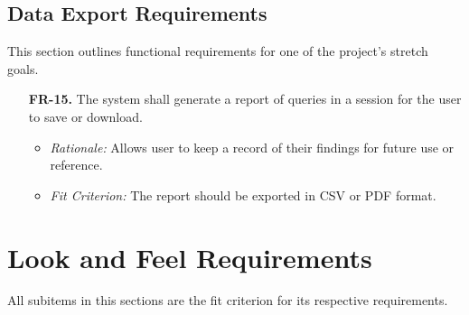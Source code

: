 \documentclass[12pt]{article}
\begin{document}
\subsection{Data Export Requirements}
This section outlines functional requirements for one of the project's stretch goals.
\begin{enumerate}
  \item[\textbf{FR-15.}] The system shall generate a report of queries in a session for the user to save or download.
  \begin{itemize}
    \item \textit{Rationale:} Allows user to keep a record of their findings for future use or reference.
    \item \textit{Fit Criterion:} The report should be exported in CSV or PDF format.
  \end{itemize}
\end{enumerate}

\section{Look and Feel Requirements}
All subitems in this sections are the fit criterion for its respective requirements. 
\end{document}
